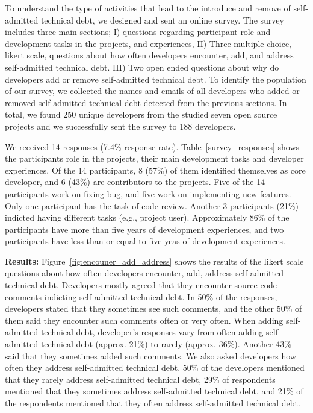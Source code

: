 To understand the type of activities that lead to the introduce and remove of self-admitted technical debt, we designed and sent an online survey. The survey includes three main sections; I)  questions regarding 
participant role and development tasks in the projects, and experiences, II) Three multiple choice, likert scale, questions about how often developers encounter, add, and address self-admitted technical debt. III) Two open ended questions about why do developers add or remove self-admitted technical debt. To identify the population of our survey, we collected the names and emails of all developers who added or removed self-admitted technical debt detected from the previous sections. In total, we found 250 unique developers from the studied seven open source projects and we successfully sent the survey to 188 developers.  

We received 14 responses (7.4\% response rate). Table~\ref{survey_responses} shows the participants role in the projects, their main development tasks and developer experiences. Of the 14 participants, 8 (57\%) of them identified themselves as core developer, and 6 (43\%) are contributors to the projects. Five of the 14 participants work on fixing bug, and five work on implementing new features. Only one participant has the task of code review. Another 3 participants (21\%) indicted having different tasks (e.g., project user). Approximately 86\% of the participants have more than five years of development experiences, and two participants have less than or equal to five yeas of development experiences.



\noindent \textbf{Results:} 
Figure~\ref{fig:encouner_add_address} shows the results of the likert scale questions about how often developers encounter, add, address self-admitted technical debt. Developers mostly agreed that they encounter source code comments indicting self-admitted technical debt. In 50\% of the responses, developers stated that they sometimes see such comments, and the other 50\% of them said they encounter such comments often or very often. When adding self-admitted technical debt, developer's responses vary from often adding self-admitted technical debt (approx. 21\%) to rarely (approx. 36\%). Another 43\% said that they sometimes added such comments. We also asked developers how often they address self-admitted technical debt. 50\% of the developers mentioned that they rarely address self-admitted technical debt, 29\% of respondents mentioned that they sometimes address self-admitted technical debt, and 21\% of the respondents mentioned that they often address self-admitted technical debt.

